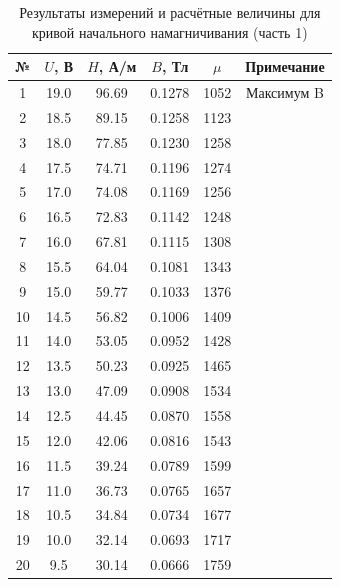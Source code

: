 \documentclass[a4paper,14pt]{article}
\begin{document}
\begin{table}[H]
\centering
\caption{Результаты измерений и расчётные величины для кривой начального намагничивания (часть 1)}
\label{tab:measurements}
\small
\begin{tabular}{|c|c|c|c|c|c|}
\hline
№ & $U$, В & $H$, А/м & $B$, Тл & $\mu$ & Примечание \\
\hline
1   & 19.0 & 96.69  & 0.1278 & 1052  & Максимум B \\
2   & 18.5 & 89.15  & 0.1258 & 1123  & \\
3   & 18.0 & 77.85  & 0.1230 & 1258  & \\
4   & 17.5 & 74.71  & 0.1196 & 1274  & \\
5   & 17.0 & 74.08  & 0.1169 & 1256  & \\
6   & 16.5 & 72.83  & 0.1142 & 1248  & \\
7   & 16.0 & 67.81  & 0.1115 & 1308  & \\
8   & 15.5 & 64.04  & 0.1081 & 1343  & \\
9   & 15.0 & 59.77  & 0.1033 & 1376  & \\
10  & 14.5 & 56.82  & 0.1006 & 1409  & \\
11  & 14.0 & 53.05  & 0.0952 & 1428  & \\
12  & 13.5 & 50.23  & 0.0925 & 1465  & \\
13  & 13.0 & 47.09  & 0.0908 & 1534  & \\
14  & 12.5 & 44.45  & 0.0870 & 1558  & \\
15  & 12.0 & 42.06  & 0.0816 & 1543  & \\
16  & 11.5 & 39.24  & 0.0789 & 1599  & \\
17  & 11.0 & 36.73  & 0.0765 & 1657  & \\
18  & 10.5 & 34.84  & 0.0734 & 1677  & \\
19  & 10.0 & 32.14  & 0.0693 & 1717  & \\
20  &  9.5 & 30.14  & 0.0666 & 1759  & \\
\hline
\end{tabular}
\end{table}
\end{document}
